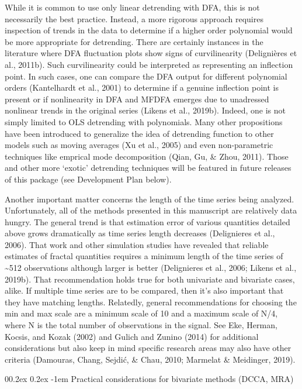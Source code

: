\documentclass[
  man]{apa6}
\makeatletter
\let\oldparagraph\paragraph
\renewcommand{\paragraph}[1]{\oldparagraph{#1}\mbox{}}
\renewcommand{\paragraph}{\@startsection{paragraph}{4}{\parindent}%
  {0\baselineskip \@plus 0.2ex \@minus 0.2ex}%
  {-1em}%
  {\normalfont\normalsize\bfseries\itshape\typesectitle}}
\makeatother
\begin{document}
While it is common to use only linear detrending with DFA, this is not
necessarily the best practice. Instead, a more rigorous approach
requires inspection of trends in the data to determine if a higher order
polynomial would be more appropriate for detrending. There are certainly
instances in the literature where DFA fluctuation plots show signs of
curvilinearity (Delignières et al., 2011b).
Such curvilinearity could be interpreted as representing an inflection
point. In such cases, one can compare the DFA output for different
polynomial orders (Kantelhardt et al., 2001) to
determine if a genuine inflection point is present or if nonlinearity in
DFA and MFDFA emerges due to unadressed nonlinear trends in the original
series (Likens et al., 2019b). Indeed, one is not simply limited to OLS
detrending with polynomials. Many other propositions have been
introduced to generalize the idea of detrending function to other models
such as moving averages (Xu et al., 2005) and even
non-parametric techniques like emprical mode decomposition
(Qian, Gu, \& Zhou, 2011). Those and other more `exotic' detrending
techniques will be featured in future releases of this package (see
Development Plan below).

Another important matter concerns the length of the time series being
analyzed. Unfortunately, all of the methods presented in this manuscript
are relatively data hungry. The general trend is that estimation error
of various quantities detailed above grows dramatically as time series
length decreases (Delignieres et al., 2006). That work and other simulation
studies have revealed that reliable estimates of fractal quantities
requires a minimum length of the time series of \textasciitilde512 observations
although larger is better (Delignieres et al., 2006; Likens et al., 2019b). That
recommendation holds true for both univariate and bivariate cases,
alike. If multiple time series are to be compared, then it's also
important that they have matching lengths. Relatedly, general
recommendations for choosing the min and max scale are a minimum scale
of 10 and a maximum scale of N/4, where N is the total number of
observations in the signal. See
Eke, Herman, Kocsis, and Kozak (2002) and
Gulich and Zunino (2014) for additional considerations
but also keep in mind specific research areas may also have other
criteria (Damouras, Chang, Sejdić, \& Chau, 2010; Marmelat \& Meidinger, 2019).

\hypertarget{practical-considerations-for-bivariate-methods-dcca-mra}{%
\paragraph{Practical considerations for bivariate methods (DCCA, MRA)}\label{practical-considerations-for-bivariate-methods-dcca-mra}}
\end{document}
